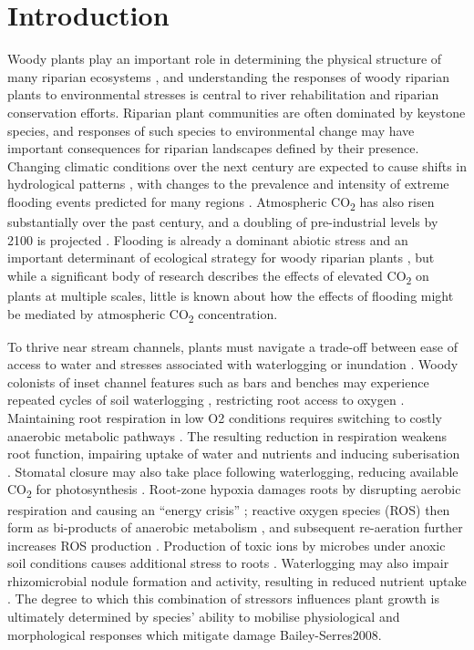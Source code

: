 \documentclass[12pt,a4paper]{memoir}
\begin{document}
\clearpage

\section{Introduction}
Woody plants play an important role in determining the physical structure of many riparian ecosystems \citep{Lawson2015}, and understanding the responses of woody riparian plants to environmental stresses is central to river rehabilitation and riparian conservation efforts. Riparian plant communities are often dominated by keystone species, and responses of such species to environmental change may have important consequences for riparian landscapes defined by their presence. Changing climatic conditions over the next century are expected to cause shifts in hydrological patterns \citep{stocker2013climate}, with changes to the prevalence and intensity of extreme flooding events predicted for many regions \citep{Hennessy2008}. Atmospheric CO\textsubscript{2} has also risen substantially over the past century, and a doubling of pre-industrial levels by 2100 is projected \citep{IPCC2014}. Flooding is already a dominant abiotic stress and an important determinant of ecological strategy for woody riparian plants \citep{Blom1996,Lawson2015}, but while a significant body of research describes the effects of elevated CO\textsubscript{2} on plants at multiple scales, little is known about how the effects of flooding might be mediated by atmospheric CO\textsubscript{2} concentration.

To thrive near stream channels, plants must navigate a trade-off between ease of access to water and stresses associated with waterlogging or inundation \citep{Naiman1993, Colmer2009}. Woody colonists of inset channel features such as bars and benches may experience repeated cycles of soil waterlogging \citep{Corenblit2009}, restricting root access to oxygen \citep{Voesenek2015}. Maintaining root respiration in low O2 conditions requires switching to costly anaerobic metabolic pathways \citep{Drew1997}. The resulting reduction in respiration weakens root function, impairing uptake of water and nutrients \citep{Piedade2010, Voesenek2015} and inducing suberisation \citep{Steudle2000}. Stomatal closure may also take place following waterlogging, reducing available CO\textsubscript{2} for photosynthesis \citep{Kozlowski1984, Else2009}. Root-zone hypoxia damages roots by disrupting aerobic respiration and causing an “energy crisis” \citep{Colmer2009}; reactive oxygen species (ROS) then form as bi-products of anaerobic metabolism \citep{Santosa2007}, and  subsequent re-aeration further increases ROS production \citep{Steffens2013}. Production of toxic ions by microbes under anoxic soil conditions causes additional stress to roots \citep{Blom1996}. Waterlogging may also impair rhizomicrobial nodule formation and activity, resulting in reduced nutrient uptake \citep{Dawson1989, Shimono2012}. The degree to which this combination of stressors influences plant growth is ultimately determined by species’ ability to mobilise physiological and morphological responses which mitigate damage {Bailey-Serres2008}.
  
\end{document}
